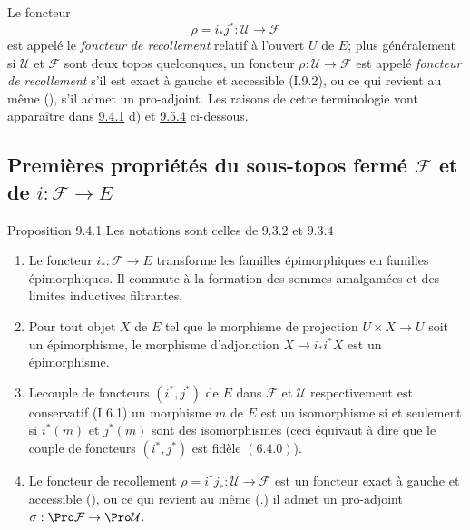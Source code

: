 \documentclass[10pt]{../fichiers-configuration-latex/smfart}
\begin{document}
Le foncteur
\begin{equation*}
\rho=i_{\ast}j^{\ast}:\mathcal{U}\longrightarrow
\mathcal{F}\tag{9.3.6.3}
\end{equation*}
est appelé le \emph{foncteur de recollement} relatif à l'ouvert $U$
de $E$; plus généralement si $\mathcal{U}$ et $\mathcal{F}$ sont
deux topos quelconques, un foncteur $\rho:\mathcal{U}\rightarrow
\mathcal{F}$ est appelé \emph{foncteur de recollement} s'il est
exact à gauche et accessible (I.9.2), ou ce qui revient au même
(), s'il admet un pro-adjoint. Les raisons de
cette terminologie vont apparaître dans \hyperref[IV.prop9.4.1]{9.4.1} d) et
\hyperref[IV.theo9.5.4]{9.5.4} ci-dessous.

\subsection{Premières propriétés du sous-topos fermé
$\mathcal{F}$ et de $i:\mathcal{F}\rightarrow
E$}

\begin{enonce*}{Proposition 9.4.1}
Les notations sont celles de $\hyperref[IV.subsubsec9.3.2]{9.3.2}$ et
$\hyperref[IV.prop9.3.4]{9.3.4}$
\begin{enumerate}
\renewcommand{\theenumi}{\alph{enumi}}
\renewcommand{\labelenumi}{\theenumi)}
\item Le foncteur $i_{\ast}:\mathcal{F}\rightarrow E$ transforme les
familles épimorphiques en familles épimorphiques. Il commute à la
formation des sommes amalgamées et des limites inductives
filtrantes.

\item Pour tout objet $X$ de $E$ tel que le morphisme de projection
$U\times X\rightarrow U$ soit un épimorphisme, le morphisme
d'adjonction $X\rightarrow i_{\ast} i^{\ast}X$ est un épimorphisme.

\item Le\pageoriginale couple de foncteurs $(i^{\ast}, j^{\ast})$ de
$E$ dans $\mathcal{F}$ et $\mathcal{U}$ respectivement est
conservatif {\rm (I 6.1)} \ie un morphisme $m$ de $E$ est un
isomorphisme si et seulement si $i^{\ast}(m)$ et $j^{\ast}(m)$ sont
des isomorphismes (ceci équivaut à dire que le couple de foncteurs
$(i^{\ast}, j^{\ast})$ est fidèle $(\hyperref[IV.subsubsec6.4.0]{6.4.0})$).

\item Le foncteur de recollement
$\rho=i^{\ast}j_{\ast}:\mathcal{U}\rightarrow \mathcal{F}$ est un
foncteur exact à gauche et accessible {\rm ()}, ou ce
qui revient au même {\rm(.)} il admet un pro-adjoint
$\sigma:\Pro\mathcal{F}\rightarrow \Pro \mathcal{U}$.
\end{enumerate}
\end{enonce*}
\end{document}
